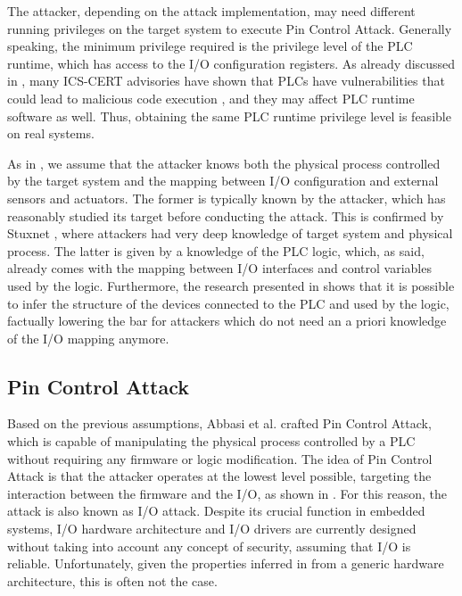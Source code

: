 The attacker, depending on the attack implementation, may need different running privileges on the target system to execute Pin Control Attack.
Generally speaking, the minimum privilege required is the privilege level of the PLC runtime, which has access to the I/O configuration registers.
As already discussed in \cite{ghostplc}, many ICS-CERT advisories have shown that PLCs have vulnerabilities that could lead to malicious code execution
\cite{plc-network,abb-codesys,codesys-server,schneider-bof,rockwell-vuln,rockwell-vuln2}, and they may affect PLC runtime software as well.
Thus, obtaining the same PLC runtime privilege level is feasible on real systems.

As in \cite{ghostplc}, we assume that the attacker knows both the physical process controlled by the target system and the mapping
between I/O configuration and external sensors and actuators. The former is typically known by the attacker, which has reasonably studied its target before conducting the attack.
This is confirmed by Stuxnet \cite{stuxnet}, where attackers had very deep knowledge of target system and physical process.
The latter is given by a knowledge of the PLC logic, which, as said, already comes with the mapping between I/O interfaces and control variables used by the logic.
Furthermore, the research presented in \cite{dynamic-payload,sabot} shows that it is possible to infer the structure of the devices connected to the PLC and used by the logic,
factually lowering the bar for attackers which do not need an a priori knowledge of the I/O mapping anymore.


\subsection{Pin Control Attack}

Based on the previous assumptions, Abbasi et al. \cite{ghostplc} crafted Pin Control Attack, which is capable of manipulating the physical process
controlled by a PLC without requiring any firmware or logic modification.
The idea of Pin Control Attack is that the attacker operates at the lowest level possible, targeting the interaction
between the firmware and the I/O, as shown in . For this reason, the attack is also known as I/O attack.
Despite its crucial function in embedded systems, I/O hardware architecture and I/O drivers are currently designed
without taking into account any concept of security, assuming that I/O is reliable. Unfortunately, given the properties inferred in 
from a generic hardware architecture, this is often not the case.

